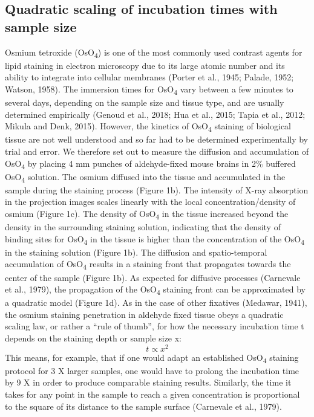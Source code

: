 \documentclass{article}
\begin{document}
\subsection*{Quadratic scaling of incubation times with sample size}
Osmium tetroxide (OsO\textsubscript{4}) is one of the most commonly used contrast agents for lipid staining in electron microscopy due to its large atomic number and its ability to integrate into cellular membranes (Porter et al., 1945; Palade, 1952; Watson, 1958). The immersion times for OsO\textsubscript{4} vary between a few minutes to several days, depending on the sample size and tissue type, and are usually determined empirically (Genoud et al., 2018; Hua et al., 2015; Tapia et al., 2012; Mikula and Denk, 2015). However, the kinetics of OsO\textsubscript{4} staining of biological tissue are not well understood and so far had to be determined experimentally by trial and error. We therefore set out to measure the diffusion and accumulation of OsO\textsubscript{4} by placing 4 mm punches of aldehyde-fixed mouse brains in 2\% buffered OsO\textsubscript{4} solution. The osmium diffused into the tissue and accumulated in the sample during the staining process (Figure 1b). The intensity of X-ray absorption in the projection images scales linearly with the local concentration/density of osmium (Figure 1c). The density of OsO\textsubscript{4} in the tissue increased beyond the density in the surrounding staining solution, indicating that the density of binding sites for OsO\textsubscript{4} in the tissue is higher than the concentration of the OsO\textsubscript{4} in the staining solution (Figure 1b). The diffusion and spatio-temporal accumulation of OsO\textsubscript{4} results in a staining front that propagates towards the center of the sample (Figure 1b). As expected for diffusive processes (Carnevale et al., 1979), the propagation of the OsO\textsubscript{4} staining front can be approximated by a quadratic model (Figure 1d). As in the case of other fixatives (Medawar, 1941), the osmium staining penetration in aldehyde fixed tissue obeys a quadratic scaling law, or rather a “rule of thumb”, for how the necessary incubation time t depends on the staining depth or sample size x:
\begin{equation*}
t \propto x^{2} \tag{1}
\end{equation*}
This means, for example, that if one would adapt an established OsO\textsubscript{4} staining protocol for 3 X larger samples, one would have to prolong the incubation time by 9 X in order to produce comparable staining results. Similarly, the time it takes for any point in the sample to reach a given concentration is proportional to the square of its distance to the sample surface (Carnevale et al., 1979).
\end{document}
